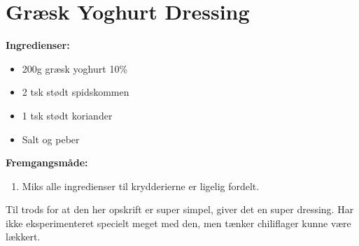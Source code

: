 \documentclass{book}
\begin{document}
\newpage \section{Græsk Yoghurt Dressing}
\begin{minipage}[t]{0.5\textwidth}
\textbf{Ingredienser:}
 \begin{itemize}
        \item 200g græsk yoghurt 10\%
        \item 2 tsk stødt spidskommen
        \item 1 tsk stødt koriander
        \item Salt og peber
    \end{itemize}
\end{minipage}
\begin{minipage}[t]{0.5\textwidth}
\textbf{Fremgangsmåde:}
\begin{enumerate}
    \item Miks alle ingredienser til krydderierne er ligelig fordelt.
\end{enumerate}
\end{minipage}
Til trods for at den her opskrift er super simpel, giver det en super dressing. Har ikke eksperimenteret specielt meget med den, men tænker chiliflager kunne være lækkert.
\newpage 
\end{document}

